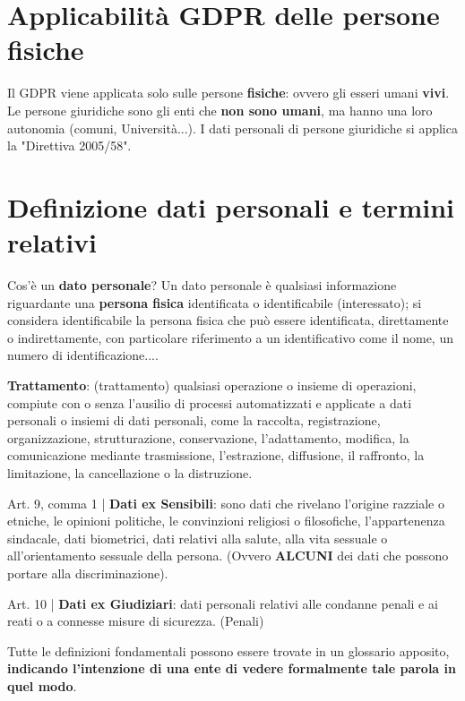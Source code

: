 \documentclass[twocolumn]{article}
\newcommand{\definition}[1]{\begin{mycolorbox}[colback=colorone]
\fontfamily{qcr}\selectfont #1 \fontfamily{cmr}\selectfont
\end{mycolorbox}}
\begin{document}
\section{Applicabilità GDPR delle persone fisiche}
Il GDPR viene applicata solo sulle persone \textbf{fisiche}: ovvero gli esseri umani \textbf{vivi}. Le persone giuridiche sono gli enti che \textbf{non sono umani}, ma hanno una loro autonomia (comuni, Università...). I dati personali di persone giuridiche si applica la "Direttiva 2005/58".

\section{Definizione dati personali e termini relativi}


Cos'è un \textbf{dato personale}? Un dato personale è qualsiasi informazione riguardante una \textbf{persona fisica} identificata o identificabile (interessato); si considera identificabile la persona fisica che può essere identificata, direttamente o indirettamente, con particolare riferimento a un identificativo come il nome, un numero di identificazione.... 
\newline
\definition{\textbf{Trattamento}: (trattamento) qualsiasi operazione o insieme di operazioni, compiute con o senza l'ausilio di processi automatizzati e applicate a dati personali o insiemi di dati personali, come la raccolta, registrazione, organizzazione, strutturazione, conservazione, l'adattamento, modifica, la comunicazione mediante trasmissione, l'estrazione, diffusione, il raffronto, la limitazione, la cancellazione o la distruzione.}
\newline

Art. 9, comma 1 | \textbf{Dati ex Sensibili}: sono dati che rivelano l'origine razziale o etniche, le opinioni politiche, le convinzioni religiosi o filosofiche, l'appartenenza sindacale, dati biometrici, dati relativi alla salute, alla vita sessuale o all'orientamento sessuale della persona. (Ovvero \textbf{ALCUNI} dei dati che possono portare alla discriminazione).
\newline

Art. 10 | \textbf{Dati ex Giudiziari}: dati personali relativi alle condanne penali e ai reati o a connesse misure di sicurezza. (Penali)
\newline

Tutte le definizioni fondamentali possono essere trovate in un glossario apposito, \textbf{indicando l'intenzione di una ente di vedere formalmente tale parola in quel modo}.
\end{document}
